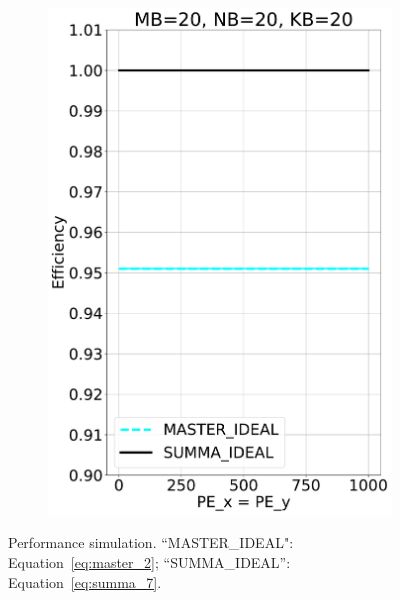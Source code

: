 \begin{figure}[t!]
\begin{subfigure}{0.32\columnwidth}
    \includegraphics[width=\linewidth]{figures/efficiency_cost_ideal_20_20_20.pdf}
  \end{subfigure}
  \caption{Performance simulation. ``MASTER\_IDEAL": Equation~\ref{eq:master_2}; ``SUMMA\_IDEAL'': Equation~\ref{eq:summa_7}.}
  \label{fig:gemm_perf_simulate_ideal}
\end{figure}





